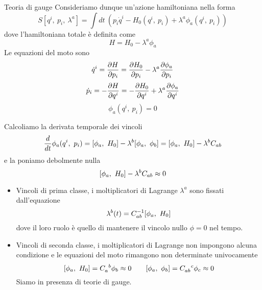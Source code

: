 \begin{frame} {Teoria di gauge}
    Consideriamo dunque un'azione hamiltoniana nella forma
    \begin{equation*} 
        S[q^i,~p_i,~\lambda^a] = \int dt ~ (p_i \dot q^i - H_0(q^i, ~p_i) + \lambda^a \phi_a (q^i, ~p_i))
    \end{equation*}
    dove l'hamiltoniana totale è definita come 
    \begin{equation*}
        H = H_0 - \lambda^a \phi_a
    \end{equation*} 
    Le equazioni del moto sono 
    \begin{equation*}
        \dot q^i = \frac{\partial H}{\partial p_i} = \frac{\partial H_0}{\partial p_i} - \lambda^a \frac{\partial\phi_a}{\partial p_i}
    \end{equation*}
    \begin{equation*}
        \dot p_i = - \frac{\partial H}{\partial q^i} = - \frac{\partial H_0}{\partial q^i} + \lambda^a \frac{\partial\phi_a}{\partial q^i}
    \end{equation*} 
    \begin{equation*} 
        \phi_a(q^i, ~p_i) = 0
    \end{equation*}
\end{frame}

\begin{frame}
    Calcoliamo la derivata temporale dei vincoli 
    \begin{equation*}
        \frac{d}{dt} \phi_a(q^i, ~p_i) = [\phi_a, ~H_0] - \lambda^b [\phi_a, ~\phi_b] = [\phi_a, ~H_0] - \lambda^b C_{ab}
    \end{equation*}
    e la poniamo debolmente nulla
    \begin{equation*} 
        [\phi_a, ~H_0] - \lambda^b C_{ab} \approx 0
    \end{equation*}

    \begin{itemize}
        \item Vincoli di prima classe, i moltiplicatori di Lagrange $\lambda^a$ sono fissati dall'equazione
        \begin{equation*}
            \lambda^b (t) = C^{-1}_{ab} [\phi_a, ~H_0]
        \end{equation*}
        dove il loro ruolo è quello di mantenere il vincolo nullo $\phi = 0$ nel tempo.
        \item Vincoli di seconda classe, i moltiplicatori di Lagrange non impongono alcuna condizione e le equazioni del moto rimangono non determinate univocamente 
        \begin{equation*} 
            \poi{\phi_a}{H_0} = C_a^{\phantom a b} \phi_b \approx 0 \qquad \poi{\phi_a}{\phi_b} = C_{ab}^{\phantom{ab} c} \phi_c \approx 0
        \end{equation*}
            Siamo in presenza di teorie di gauge.
        \end{itemize}

\end{frame}

